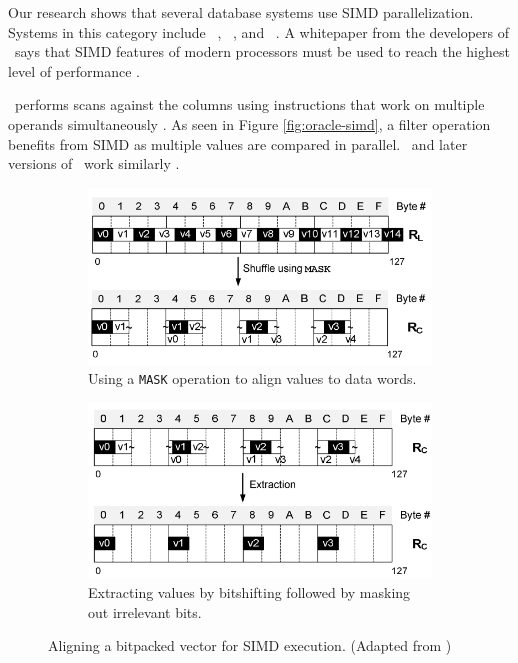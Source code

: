 Our research shows that several database systems use SIMD parallelization. Systems in this category include \oracle~\cite{Lahiri2015-mz}, \blink~\cite{Barber2012-xt}, and \ibm~\cite{Raman2013-em}. A whitepaper from the developers of \exasol~says that SIMD features of modern processors must be used to reach the highest level of performance \cite{Exasol2014-xh}.

\oracle~performs scans against the columns using instructions that work on multiple operands simultaneously \cite{Lahiri2015-mz}. As seen in Figure \ref{fig:oracle-simd}, a filter operation benefits from SIMD as multiple values are compared in parallel. \ibm~and later versions of \blink~work similarly \cite{Barber2012-xt, Raman2013-em}.

\begin{figure}
  \centering
  \begin{subfigure}{0.45\textwidth}
    \includegraphics[width=\textwidth]{img/simd-align-1.png}
    \caption{Using a \texttt{MASK} operation to align values to data words.}
    \label{fig:simd-align-1} 
  \end{subfigure}
  \begin{subfigure}{0.45\textwidth}
    \includegraphics[width=\textwidth]{img/simd-align-2.png}
    \caption{Extracting values by bitshifting followed by masking out irrelevant bits.}
    \label{fig:simd-align-2} 
  \end{subfigure}
  \caption{Aligning a bitpacked vector for SIMD execution. (Adapted from \cite{Willhalm2009-hu})}
  \label{fig:simd-align} 
\end{figure}

